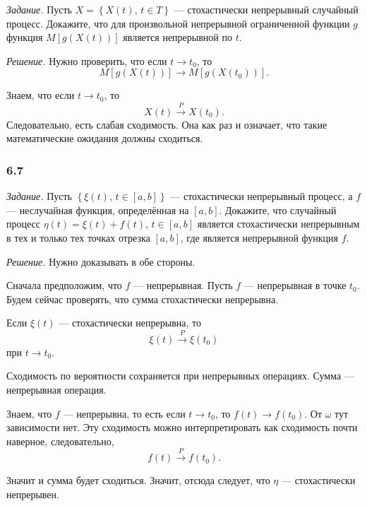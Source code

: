 \textit{Задание.}
Пусть $X = \left\{ X \left( t \right), \, t \in T \right\} $ ---
стохастически непрерывный случайный процесс.
Докажите, что для произвольной непрерывной ограниченной функции $g$ функция
$M \left[ g \left( X \left( t \right) \right) \right] $ является непрерывной по $t$.

\textit{Решение.}
Нужно проверить, что если $t \to t_0$, то
$$M \left[ g \left( X \left( t \right) \right) \right] \to
  M \left[ g \left( X \left( t_0 \right) \right) \right].$$

Знаем, что если $t \to t_0$, то
$$X \left( t \right) \overset{P}{ \to }
  X \left( t_0 \right).$$
Следовательно, есть слабая сходимость.
Она как раз и означает, что такие математические ожидания должны сходиться.

\subsubsection*{6.7}

\textit{Задание.}
Пусть $ \left\{ \xi \left( t \right), \, t \in \left[ a, b \right] \right\} $ ---
стохастически непрерывный процесс, а $f$ --- неслучайная функция,
определённая на $ \left[ a, b \right] $.
Докажите, что случайный процесс
$ \eta \left( t \right) =
  \xi \left( t \right) + f \left( t \right), \, t \in \left[ a, b \right] $
является стохастически непрерывным в тех и только тех точках отрезка $ \left[ a, b \right] $,
где является непрерывной функция $f$.

\textit{Решение.}
Нужно доказывать в обе стороны.

Сначала предположим, что $f$ --- непрерывная.
Пусть $f$ --- непрерывная в точке $t_0$.
Будем сейчас проверять, что сумма стохастически непрерывна.

Если $ \xi \left( t \right) $ --- стохастически непрерывна, то
$$ \xi \left( t \right) \overset{P}{ \to }
  \xi \left( t_0 \right)$$
при $t \to t_0$.

Сходимость по вероятности сохраняется при непрерывных операциях.
Сумма --- непрерывная операция.

Знаем, что $f$ --- непрерывна, то есть если $t \to t_0$,
то $f \left( t \right) \to f \left( t_0 \right) $.
От $ \omega $ тут зависимости нет.
Эту сходимость можно интерпретировать как сходимость почти наверное, следовательно,
$$f \left( t \right) \overset{P}{ \to }
  f \left( t_0 \right).$$

Значит и сумма будет сходиться.
Значит, отсюда следует, что $ \eta $ --- стохастически непрерывен.

